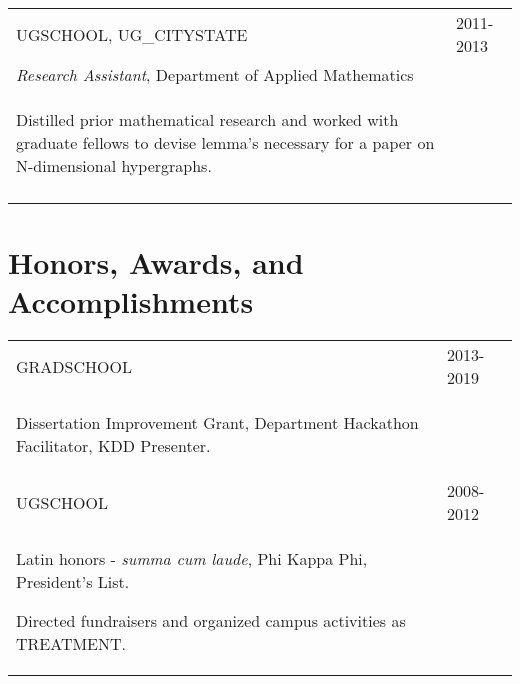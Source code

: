 \documentclass[a4paper,10pt]{article}
\begin{document}
\begin{supertabular}{p{13.9cm}>{\raggedleft\arraybackslash}p{3.4cm}}
	\textsc{UGSCHOOL}, UG_CITYSTATE
	& \textsc{2011-2013} \\
	\small	\emph{Research Assistant}, Department of Applied Mathematics & \\
	\begin{enumerate*}[label =$\circ$, itemjoin={\newline}]
		\item \footnotesize Distilled prior mathematical research and worked with graduate fellows to devise lemma's necessary for a paper on N-dimensional hypergraphs. 
	\end{enumerate*} & \\
	 \\


\end{supertabular}







\section{Honors, Awards, and Accomplishments}
\begin{supertabular}{p{13.9cm}>{\raggedleft\arraybackslash}p{3.4cm}}

	\textsc{GRADSCHOOL} 
	& \textsc{2013-2019} \\
	\begin{enumerate*}[label =$\circ$, itemjoin={\newline}]
		\item \footnotesize Dissertation Improvement Grant, Department Hackathon Facilitator, KDD Presenter.
	\end{enumerate*} \vspace{2mm} & \\

	\textsc{UGSCHOOL} 
	& \textsc{2008-2012} \\
	\begin{enumerate*}[label =$\circ$, itemjoin={\newline}]
		\item \footnotesize  Latin honors - \emph{summa cum laude}, Phi Kappa Phi, President's List.
		\item \footnotesize  Directed fundraisers and organized campus activities as TREATMENT.
	\end{enumerate*} \vspace{0mm} & \\



\end{supertabular}
\end{document}
